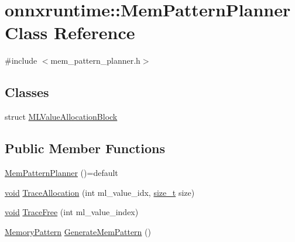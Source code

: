 \hypertarget{classonnxruntime_1_1MemPatternPlanner}{}\section{onnxruntime\+:\+:Mem\+Pattern\+Planner Class Reference}
\label{classonnxruntime_1_1MemPatternPlanner}


{\ttfamily \#include $<$mem\+\_\+pattern\+\_\+planner.\+h$>$}

\subsection*{Classes}
\begin{DoxyCompactItemize}
\item 
struct \mbox{\hyperlink{structonnxruntime_1_1MemPatternPlanner_1_1MLValueAllocationBlock}{M\+L\+Value\+Allocation\+Block}}
\end{DoxyCompactItemize}
\subsection*{Public Member Functions}
\begin{DoxyCompactItemize}
\item 
\mbox{\hyperlink{classonnxruntime_1_1MemPatternPlanner_a331275f6172142627b52ecc09ef5c8d4}{Mem\+Pattern\+Planner}} ()=default
\item 
\mbox{\hyperlink{mlasi_8h_a88f941d423cb2a819b70a1358982b1a6}{void}} \mbox{\hyperlink{classonnxruntime_1_1MemPatternPlanner_a024ca843effacf25fa1fe730c2be73a3}{Trace\+Allocation}} (int ml\+\_\+value\+\_\+idx, \mbox{\hyperlink{mlasi_8h_a503efbc1c6e50825320ad909366b78ab}{size\+\_\+t}} size)
\item 
\mbox{\hyperlink{mlasi_8h_a88f941d423cb2a819b70a1358982b1a6}{void}} \mbox{\hyperlink{classonnxruntime_1_1MemPatternPlanner_a5ec1e13a1d5b467ccce1582b114edc8a}{Trace\+Free}} (int ml\+\_\+value\+\_\+index)
\item 
\mbox{\hyperlink{classonnxruntime_1_1MemoryPattern}{Memory\+Pattern}} \mbox{\hyperlink{classonnxruntime_1_1MemPatternPlanner_a0bfd9cf766b9735859210c381856a357}{Generate\+Mem\+Pattern}} ()
\end{DoxyCompactItemize}
